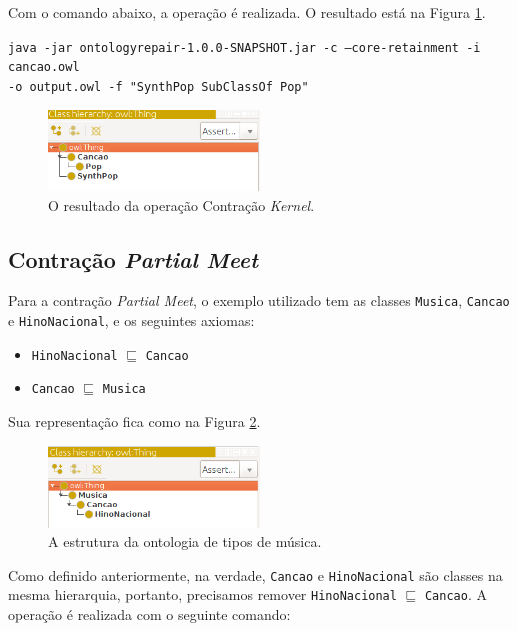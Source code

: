 Com o comando abaixo, a operação é realizada. O resultado está na Figura \ref{img:ck2}.

\begin{small}
	\texttt{java -jar ontologyrepair-1.0.0-SNAPSHOT.jar -c --core-retainment -i cancao.owl \\ -o output.owl -f "SynthPop SubClassOf Pop"}
\end{small}

\begin{figure}[H]
	\centering
	\includegraphics[width=0.5\textwidth]{Capitulos/Implementacao/ck2.png}
	\caption{O resultado da operação Contração \textit{Kernel}.}
	\label{img:ck2}
\end{figure}


\subsection{Contração \textit{Partial Meet}}

Para a contração \textit{Partial Meet}, o exemplo utilizado tem as classes \texttt{Musica}, \texttt{Cancao} e \texttt{HinoNacional}, e os seguintes axiomas: 

\begin{itemize}
	\item \texttt{HinoNacional} $ \sqsubseteq $ \texttt{Cancao}
	\item \texttt{Cancao} $ \sqsubseteq $ \texttt{Musica}
\end{itemize}

Sua representação fica como na Figura \ref{img:cpm1}.

\begin{figure}[H]
	\centering
	\includegraphics[width=0.5\textwidth]{Capitulos/Implementacao/cpm1.png}
	\caption{A estrutura da ontologia de tipos de música.}
	\label{img:cpm1}
\end{figure}

Como definido anteriormente, na verdade, \texttt{Cancao} e \texttt{HinoNacional} são classes na mesma hierarquia, portanto, precisamos remover \texttt{HinoNacional} $ \sqsubseteq $ \texttt{Cancao}. A operação é realizada com o seguinte comando:

